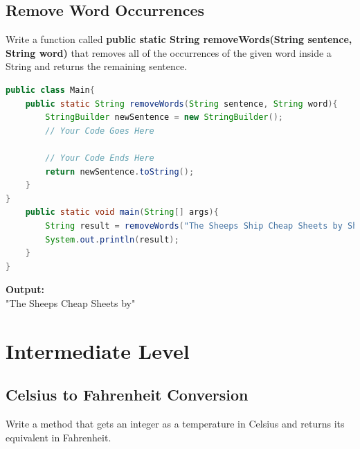 \documentclass[12pt , a4paper]{article}
\begin{document}
	\newpage
	\subsection{Remove Word Occurrences}
Write a function called \textbf{public static String removeWords(String sentence, String word)} that removes all of the occurrences of the given word inside a String and returns the remaining sentence.

	\begin{lstlisting}[language=Java]
public class Main{
	public static String removeWords(String sentence, String word){
		StringBuilder newSentence = new StringBuilder();
		// Your Code Goes Here

		// Your Code Ends Here	
		return newSentence.toString();
	}
}
	public static void main(String[] args){
		String result = removeWords("The Sheeps Ship Cheap Sheets by Ship", "Ship");
		System.out.println(result);
	}
}
	\end{lstlisting}


	\begin{tcolorbox}
	\textbf{Output:}\\
	"The Sheeps Cheap Sheets by"
	\end{tcolorbox}

%
%
\newpage
\section{Intermediate Level}

	\subsection{Celsius to Fahrenheit Conversion}
Write a method that gets an integer as a temperature in Celsius and returns its equivalent in Fahrenheit.
\end{document}
